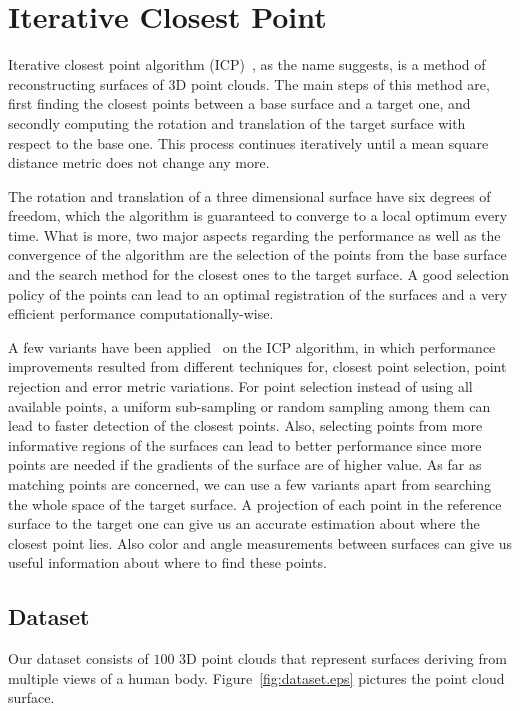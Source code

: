 \section{Iterative Closest Point}
\label{icp}

Iterative closest point algorithm (ICP)~\cite{icpOr}, as the name suggests, is a method of reconstructing surfaces of 3D point clouds. The main steps of this method are, first  finding the closest points between a base surface and a target one, and secondly computing the rotation and translation of the target surface with respect to the base one. This process continues iteratively until a mean square distance metric does not change any more.

The rotation and translation of a three dimensional surface have six degrees of freedom, which the algorithm is guaranteed to converge to a local optimum every time. What is more, two major aspects regarding the performance as well as the convergence of the algorithm are the selection of the points from the base surface and the search method for the closest ones to the target surface. A good selection policy of the points can lead to an optimal registration of the surfaces and a very efficient performance computationally-wise.

A few variants have been applied~\cite{icpVar} on the ICP algorithm, in which performance improvements resulted from different techniques for, closest point selection, point rejection and error metric variations. For point selection instead of using all available points, a uniform sub-sampling or random sampling among them can lead to faster detection of the closest points. Also, selecting points from more informative regions of the surfaces can lead to better performance since more points are needed if the gradients of the surface are of higher value. As far as matching points are concerned, we can use a few variants apart from searching the whole space of the target surface. A projection of each point in the reference surface to the target one can give us an accurate estimation about where the closest point lies. Also color and angle measurements between surfaces can give us useful information about where to find these points.

\subsection{Dataset}
Our dataset consists of $100$ 3D point clouds that represent surfaces deriving from multiple views of a human body. Figure~\ref{fig:dataset.eps} pictures the point cloud surface.

